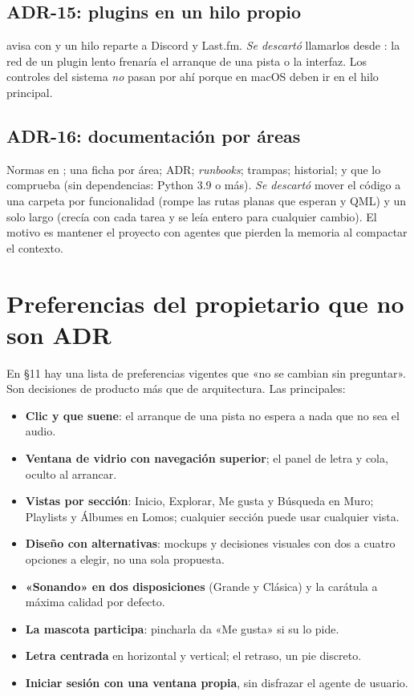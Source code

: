 \subsection{ADR-15: plugins en un hilo propio}

 avisa con  y un hilo reparte a Discord y Last.fm. \emph{Se
descartó} llamarlos desde : la red de un plugin lento frenaría el arranque de una
pista o la interfaz. Los controles del sistema \emph{no} pasan por ahí porque en macOS deben
ir en el hilo principal.

\subsection{ADR-16: documentación por áreas}

Normas en ; una ficha por área; ADR; \emph{runbooks}; trampas; historial; y
 que lo comprueba (sin dependencias: Python 3.9 o más). \emph{Se
descartó} mover el código a una carpeta por funcionalidad (rompe las rutas planas que esperan
 y QML) y un solo  largo (crecía con cada tarea y se leía
entero para cualquier cambio). El motivo es mantener el proyecto con agentes que pierden la
memoria al compactar el contexto.

\section{Preferencias del propietario que no son ADR}

En  §11 hay una lista de preferencias vigentes que «no se cambian sin
preguntar». Son decisiones de producto más que de arquitectura. Las principales:

\begin{itemize}
  \item \textbf{Clic y que suene}: el arranque de una pista no espera a nada que no sea el
  audio.
  \item \textbf{Ventana de vidrio con navegación superior}; el panel de letra y cola, oculto al
  arrancar.
  \item \textbf{Vistas por sección}: Inicio, Explorar, Me gusta y Búsqueda en Muro;
  Playlists y Álbumes en Lomos; cualquier sección puede usar cualquier vista.
  \item \textbf{Diseño con alternativas}: mockups y decisiones visuales con dos a cuatro
  opciones a elegir, no una sola propuesta.
  \item \textbf{«Sonando» en dos disposiciones} (Grande y Clásica) y la carátula a máxima
  calidad por defecto.
  \item \textbf{La mascota participa}: pincharla da «Me gusta» si su  lo pide.
  \item \textbf{Letra centrada} en horizontal y vertical; el retraso, un pie discreto.
  \item \textbf{Iniciar sesión con una ventana propia}, sin disfrazar el agente de usuario.
\end{itemize}

